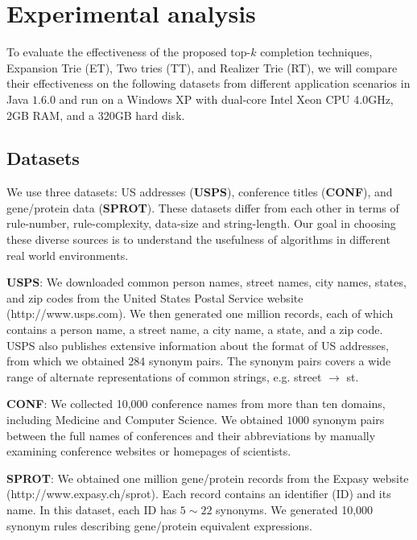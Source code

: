 \section{Experimental analysis}

To evaluate the effectiveness of the proposed top-$k$ completion
techniques, Expansion Trie (ET), Two tries (TT), and  Realizer Trie (RT), we will compare
their effectiveness on the following datasets from different
application scenarios in Java $1.6.0$ and run on a
Windows XP with dual-core Intel Xeon CPU 4.0GHz, 2GB RAM, and a 320GB hard disk.


\subsection{Datasets}
We use three datasets: US addresses (\textbf{USPS}),
conference titles  (\textbf{CONF}), and gene/protein data
(\textbf{SPROT}). These datasets differ from each other in terms of rule-number, rule-complexity, data-size and string-length. Our goal in choosing these diverse sources is to understand the usefulness of algorithms in different real world environments.

\smallskip
\noindent \textbf{{USPS}}: We downloaded common person names, street names,
city names, states, and zip codes from the United States Postal
Service website ({\footnotesize http://www.usps.com}). We then generated
one million records, each of which contains a person name, a street
name, a city name, a state, and a zip code. USPS also publishes
extensive information about the format of US addresses, from which we
obtained 284 synonym pairs. The synonym pairs covers a wide range of alternate
representations of common strings, e.g. street $\rightarrow$ st.


\noindent \textbf{{CONF}}: We collected 10,000 conference names
from more than ten domains, including Medicine and Computer
Science.
We obtained $1000$ synonym pairs between the full names of conferences and their
abbreviations by manually examining conference websites or homepages
of scientists.


\noindent \textbf{{SPROT}}: We obtained one million gene/protein records
from the Expasy website ({\footnotesize http://www.expasy.ch/sprot}).
Each record contains an identifier (ID) and its name.
In this dataset, each ID has $5\sim22$ synonyms. We generated 10,000 synonym rules describing gene/protein
equivalent expressions.

